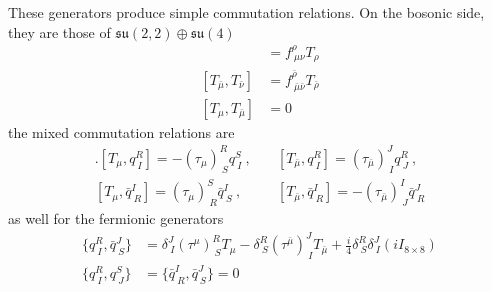 \documentclass[a4paper,12pt]{article}
\numberwithin{equation}{section}
\numberwithin{thm}{section}
\numberwithin{exm}{section}
\newcommand{\<}{{\langle}}
\renewcommand{\>}{{\rangle}}
\newcommand{\mf}{\mathfrak}
\renewcommand{\d}{{\delta}}
\newcommand{\m}{{\mu}}
\newcommand{\n}{{\nu}}
\renewcommand{\r}{{\rho}}
\begin{document}
These generators produce simple commutation relations. On the bosonic side, they are those of $\mf{su}(2,2)\oplus \mf{su}(4)$
	\begin{align}
	[T_\m, T_\n] & = f^\r_{\ \m\n} T_\r \\
	[T_{\bar\m}, T_{\bar\n}] & = f^{\bar\r}_{\ \bar\m\bar\n} T_{\bar\r} \\
	[T_\m, T_{\bar\m}] & = 0
	\end{align}
the mixed commutation relations are
	\begin{equation}
	\begin{aligned}
	.[T_\m, q^R_{\ I}] = -(\tau_\m)^R_{\ S} q^S_{\ I}\ , & \quad [T_{\bar\m}, q^R_{\ I}] = (\tau_{\bar\m})^J_{\ I} q^R_{\ J}\ , \\
	[T_\m,\bar q^I_{\ R}] = (\tau_\m)^S_{\ R} \bar q^I_{\ S}\ , & \quad [T_{\bar\m}, \bar q^I_{\ R}] = -(\tau_{\bar\m})^I_{\ J} \bar q^J_{\ R}
	\end{aligned}
	\end{equation}
as well for the fermionic generators
	\begin{align}
	\{q^R_{\ I}, \bar q^J_{\ S}\} & = \d^J_{\ I} (\tau^\m)^R_{\ S} T_\m - \d^R_{\ S} (\tau^{\bar\m})^J_{\ I}T_{\bar\m} + \frac{i}{4} \d^R_{\ S} \d^J_{\ I} (iI_{8\times 8}) \\
	\{q^R_{\ I}, q^S_{\ J}\} & = \{\bar q^I_{\ R}, \bar q^J_{\ S}\} = 0 
	\end{align}
\end{document}

